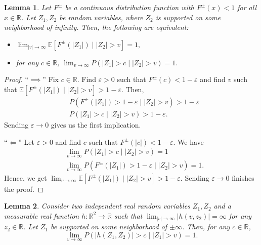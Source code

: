\documentclass[a4paper,11pt]{article}
\newtheorem{lemma}{Lemma}
\begin{document}
\begin{lemma}\label{Observation2}
Let  $F^{\pm}$ be a continuous distribution function with $F^{\pm}(x)<1$ for all $x\in\mathbb{R}$. 
Let $Z_1, Z_2$ be random variables, where $Z_2$ is supported on some neighborhood of infinity. Then, the following are equivalent:
\begin{itemize}
    \item    $
        \lim_{|v|\to\infty} \mathbb{E}[ F^{\pm}(|Z_1|)\mid |Z_2|>v] = 1,
   $
    \item for any $c\in\mathbb{R}$, $ \lim_{v\to\infty}P(|Z_1|> c\mid |Z_2|>v) = 1.$
\end{itemize}
\end{lemma}
\begin{proof}
``$\implies$'' Fix $c\in\mathbb{R}$. Find $\varepsilon>0$ such that $F^{\pm}(c)<1-\varepsilon$ and find $v$ such that $\mathbb{E}[ F^{\pm}(|Z_1|)\mid |Z_2|>v] >1-\varepsilon.$ Then,  
\begin{align*}
    &P(F^{\pm}(|Z_1|)>1-\varepsilon\mid |Z_2|>v)>1-\varepsilon\\
    &P(|Z_1|>c\mid |Z_2|>v)>1-\varepsilon.
\end{align*}
Sending $\varepsilon\to 0 $ gives us the first implication. 

``$\Longleftarrow$'' Let  $\varepsilon>0$ and find $c$  such that  $F^{\pm}(|c|)<1-\varepsilon$.  We have 
\begin{align*}
   & \lim_{v\to\infty}P(|Z_1|> c\mid |Z_2|>v) = 1 \\&
   \lim_{v\to\infty}P(F^{\pm}(|Z_1|)> 1-\varepsilon\mid |Z_2|>v) = 1.
\end{align*}
Hence, we get $\lim_{v\to\infty}\mathbb{E}[F^{\pm}(|Z_1|)\mid |Z_2|>v] >1-\varepsilon$. Sending $\varepsilon\to 0 $ finishes the proof. 
\end{proof}


\begin{lemma}\label{LemmaAboutInfinity2}
Consider two independent real random variables $Z_1, Z_2$ and a measurable real function $h:\mathbb{R}^2\to\mathbb{R}$ such that $\lim_{|v|\to\infty}|h(v, z_2)| = \infty$ for any $z_2\in\mathbb{R}$. Let $Z_1$ be supported on some neighborhood of $\pm\infty$. Then, for any $c\in\mathbb{R}$, 
$$
\lim_{v\to\infty} P(|h(Z_1, Z_2)|> c\mid |Z_1|>v)=1.
$$
\end{lemma}
\end{document}
